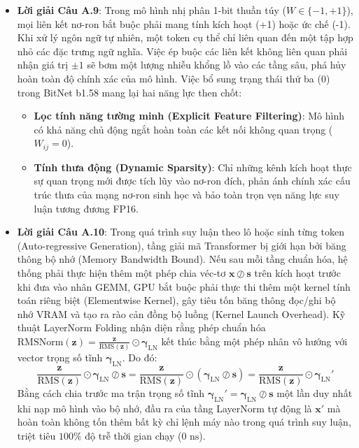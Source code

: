 \begin{itemize}
  \item \textbf{Lời giải Câu A.9}:
  Trong mô hình nhị phân 1-bit thuần túy ($W \in \{-1, +1\}$), mọi liên kết nơ-ron bắt buộc phải mang tính kích hoạt (+1) hoặc ức chế (-1). Khi xử lý ngôn ngữ tự nhiên, một token cụ thể chỉ liên quan đến một tập hợp nhỏ các đặc trưng ngữ nghĩa. Việc ép buộc các liên kết không liên quan phải nhận giá trị $\pm 1$ sẽ bơm một lượng nhiễu khổng lồ vào các tầng sâu, phá hủy hoàn toàn độ chính xác của mô hình.
  Việc bổ sung trạng thái thứ ba ($0$) trong BitNet b1.58 mang lại hai năng lực then chốt:
  \begin{itemize}
    \item \textbf{Lọc tính năng tường minh (Explicit Feature Filtering)}: Mô hình có khả năng chủ động ngắt hoàn toàn các kết nối không quan trọng ($W_{ij} = 0$).
    \item \textbf{Tính thưa động (Dynamic Sparsity)}: Chỉ những kênh kích hoạt thực sự quan trọng mới được tích lũy vào nơ-ron đích, phản ánh chính xác cấu trúc thưa của mạng nơ-ron sinh học và bảo toàn trọn vẹn năng lực suy luận tương đương FP16.
  \end{itemize}

  \item \textbf{Lời giải Câu A.10}:
  Trong quá trình suy luận theo lô hoặc sinh từng token (Auto-regressive Generation), tầng giải mã Transformer bị giới hạn bởi băng thông bộ nhớ (Memory Bandwidth Bound). Nếu sau mỗi tầng chuẩn hóa, hệ thống phải thực hiện thêm một phép chia véc-tơ $\mathbf{x} \oslash \mathbf{s}$ trên kích hoạt trước khi đưa vào nhân GEMM, GPU bắt buộc phải thực thi thêm một kernel tính toán riêng biệt (Elementwise Kernel), gây tiêu tốn băng thông đọc/ghi bộ nhớ VRAM và tạo ra rào cản đồng bộ luồng (Kernel Launch Overhead).
  Kỹ thuật LayerNorm Folding nhận diện rằng phép chuẩn hóa $\text{RMSNorm}(\mathbf{z}) = \frac{\mathbf{z}}{\text{RMS}(\mathbf{z})} \odot \boldsymbol{\gamma}_{\text{LN}}$ kết thúc bằng một phép nhân vô hướng với vector trọng số tĩnh $\boldsymbol{\gamma}_{\text{LN}}$. Do đó:
  \begin{equation*}
  \frac{\mathbf{z}}{\text{RMS}(\mathbf{z})} \odot \boldsymbol{\gamma}_{\text{LN}} \oslash \mathbf{s} = \frac{\mathbf{z}}{\text{RMS}(\mathbf{z})} \odot \left( \boldsymbol{\gamma}_{\text{LN}} \oslash \mathbf{s} \right) = \frac{\mathbf{z}}{\text{RMS}(\mathbf{z})} \odot \boldsymbol{\gamma}_{\text{LN}}'
  \end{equation*}
  Bằng cách chia trước ma trận trọng số tĩnh $\boldsymbol{\gamma}_{\text{LN}}' = \boldsymbol{\gamma}_{\text{LN}} \oslash \mathbf{s}$ một lần duy nhất khi nạp mô hình vào bộ nhớ, đầu ra của tầng LayerNorm tự động là $\mathbf{x}'$ mà hoàn toàn không tốn thêm bất kỳ chỉ lệnh máy nào trong quá trình suy luận, triệt tiêu $100\%$ độ trễ thời gian chạy ($0\text{ ns}$).


\end{itemize}

